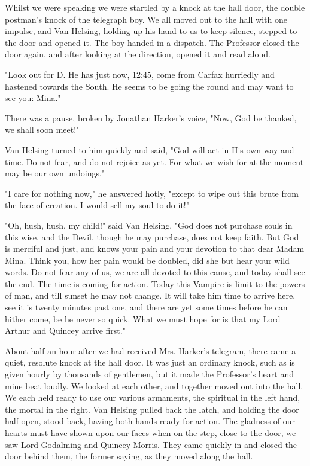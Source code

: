 Whilst we were speaking we were startled by a knock at the hall door, the double postman's knock of the telegraph boy. We all moved out to the hall with one impulse, and Van Helsing, holding up his hand to us to keep silence, stepped to the door and opened it. The boy handed in a dispatch. The Professor closed the door again, and after looking at the direction, opened it and read aloud. 

"Look out for D. He has just now, 12:45, come from Carfax hurriedly and hastened towards the South. He seems to be going the round and may want to see you: Mina." 

There was a pause, broken by Jonathan Harker's voice, "Now, God be thanked, we shall soon meet!" 

Van Helsing turned to him quickly and said, "God will act in His own way and time. Do not fear, and do not rejoice as yet. For what we wish for at the moment may be our own undoings." 

"I care for nothing now," he answered hotly, "except to wipe out this brute from the face of creation. I would sell my soul to do it!" 

"Oh, hush, hush, my child!" said Van Helsing. "God does not purchase souls in this wise, and the Devil, though he may purchase, does not keep faith. But God is merciful and just, and knows your pain and your devotion to that dear Madam Mina. Think you, how her pain would be doubled, did she but hear your wild words. Do not fear any of us, we are all devoted to this cause, and today shall see the end. The time is coming for action. Today this Vampire is limit to the powers of man, and till sunset he may not change. It will take him time to arrive here, see it is twenty minutes past one, and there are yet some times before he can hither come, be he never so quick. What we must hope for is that my Lord Arthur and Quincey arrive first." 

About half an hour after we had received Mrs. Harker's telegram, there came a quiet, resolute knock at the hall door. It was just an ordinary knock, such as is given hourly by thousands of gentlemen, but it made the Professor's heart and mine beat loudly. We looked at each other, and together moved out into the hall. We each held ready to use our various armaments, the spiritual in the left hand, the mortal in the right. Van Helsing pulled back the latch, and holding the door half open, stood back, having both hands ready for action. The gladness of our hearts must have shown upon our faces when on the step, close to the door, we saw Lord Godalming and Quincey Morris. They came quickly in and closed the door behind them, the former saying, as they moved along the hall. 

